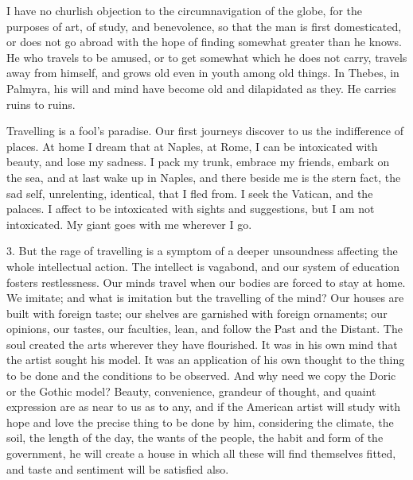 \documentclass{article}
\begin{document}
I have no churlish objection to the circumnavigation of the globe, for the
purposes of art, of study, and benevolence, so that the man is first
domesticated, or does not go abroad with the hope of finding somewhat
greater than he knows. He who travels to be amused, or to get somewhat which
he does not carry, travels away from himself, and grows old even in youth
among old things. In Thebes, in Palmyra, his will and mind have become old
and dilapidated as they. He carries ruins to ruins.

Travelling is a fool's paradise. Our first journeys discover to us the
indifference of places. At home I dream that at Naples, at Rome, I can be
intoxicated with beauty, and lose my sadness. I pack my trunk, embrace my
friends, embark on the sea, and at last wake up in Naples, and there beside
me is the stern fact, the sad self, unrelenting, identical, that I fled
from. I seek the Vatican, and the palaces. I affect to be intoxicated with
sights and suggestions, but I am not intoxicated. My giant goes with me
wherever I go.

3. But the rage of travelling is a symptom of a deeper unsoundness affecting
the whole intellectual action. The intellect is vagabond, and our system of
education fosters restlessness. Our minds travel when our bodies are forced
to stay at home. We imitate; and what is imitation but the travelling of the
mind? Our houses are built with foreign taste; our shelves are garnished
with foreign ornaments; our opinions, our tastes, our faculties, lean, and
follow the Past and the Distant. The soul created the arts wherever they
have flourished. It was in his own mind that the artist sought his model. It
was an application of his own thought to the thing to be done and the
conditions to be observed. And why need we copy the Doric or the Gothic
model? Beauty, convenience, grandeur of thought, and quaint expression are
as near to us as to any, and if the American artist will study with hope and
love the precise thing to be done by him, considering the climate, the soil,
the length of the day, the wants of the people, the habit and form of the
government, he will create a house in which all these will find themselves
fitted, and taste and sentiment will be satisfied also.
\end{document}
